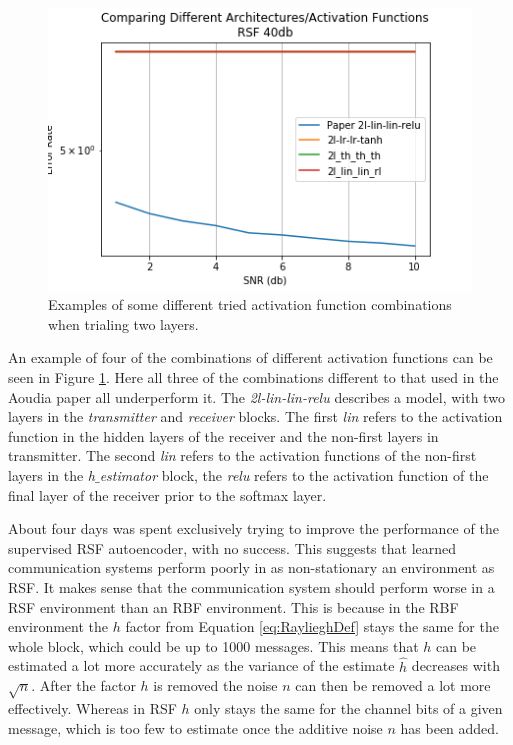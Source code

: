 \documentclass[12pt,onecolumn,letterpaper]{article}
\newcommand{\code}{\textit}
\newcommand\genfigsize{0.5}
\begin{document}
\begin{figure}
   \centering
   \includegraphics[width=\genfigsize\linewidth]{figures/aoudia_paper/rsf_unsuccessful_alt_archs.png}
   \caption{Examples of some different tried activation function combinations when trialing two layers.}
   \label{fig:RsfActivationFuncCombs}
\end{figure}

An example of four of the combinations of different activation functions can be seen in Figure \ref{fig:RsfActivationFuncCombs}. Here all three of the combinations different to that used in the Aoudia paper all underperform it. The \textit{2l-lin-lin-relu} describes a model, with two layers in the \code{transmitter} and \code{receiver} blocks. The first \code{lin} refers to the activation function in the hidden layers of the receiver and the non-first layers in transmitter. The second \code{lin} refers to the activation functions of the non-first layers in the \code{h$\_$estimator} block, the \code{relu} refers to the activation function of the final layer of the receiver prior to the softmax layer.

About four days was spent exclusively trying to improve the performance of the supervised RSF autoencoder, with no success. This suggests that learned communication systems perform poorly in as non-stationary an environment as RSF. It makes sense that the communication system should perform worse in a RSF environment than an RBF environment. This is because in the RBF environment the $h$ factor from Equation \ref{eq:RaylieghDef} stays the same for the whole block, which could be up to 1000 messages. This means that $h$ can be estimated a lot more accurately as the variance of the estimate $\hat{h}$ decreases with $\sqrt{n}$. After the factor $h$ is removed the noise $n$ can then be removed a lot more effectively. Whereas in RSF $h$ only stays the same for the channel bits of a given message, which is too few to estimate once the additive noise $n$ has been added. 
\end{document}
